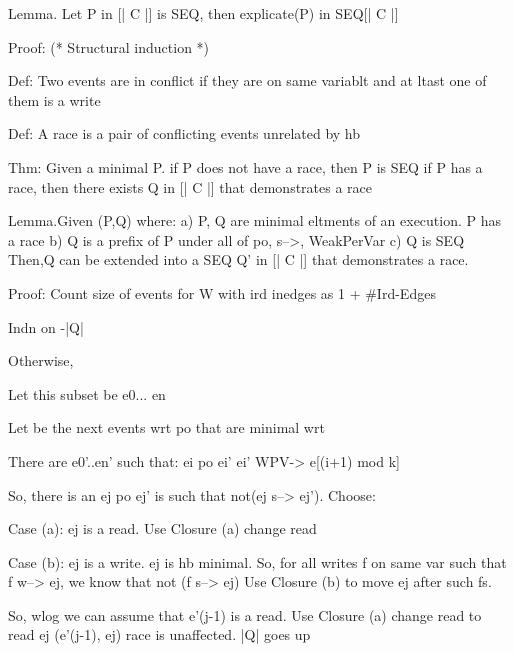 Lemma.  Let P in [| C |] is SEQ,  then explicate(P) in SEQ[| C |]

Proof: (* Structural induction *)
  

Def: Two events are in conflict if they are on same variablt and at ltast one of them is a write 

Def: A race is a pair of conflicting events unrelated by hb
 

  
Thm:
Given a minimal P.
    if P does not have a race, then P is SEQ
    if P has a race, then there exists Q in [| C |] that demonstrates a race

Lemma.Given (P,Q) where:
          a) P, Q are minimal eltments of an execution.  P has a race
          b) Q is a prefix of P under all of po, s-->, WeakPerVar
          c) Q is SEQ
    Then,Q can be extended into a SEQ Q' in [| C |] that demonstrates a race.
          
Proof:    
Count size of events for W with ird inedges as 1 + #Ird-Edges 

Indn on -|Q|



Otherwise, 

Let this subset be e0... en

Let  be the next events wrt po that are minimal wrt 

  There are e0'..en'  such that:
                ei   po  ei'
                ei'  WPV-> e[(i+1) mod k]

  


  So, there is an ej po ej' is such that not(ej s--> ej').  Choose:

  Case (a): ej is a read.  
                  Use Closure (a) change read

  Case (b): ej is a write.
                 ej is hb minimal.
                 So, for all writes f on same var such that f w--> ej, we know that not (f s--> ej) 
                 Use Closure (b) to move ej after such fs.

                 So, wlog we can assume that e'(j-1) is a read.  
                 Use Closure (a) change read to read ej
                 (e'(j-1), ej) race is unaffected.
                 |Q| goes up

      